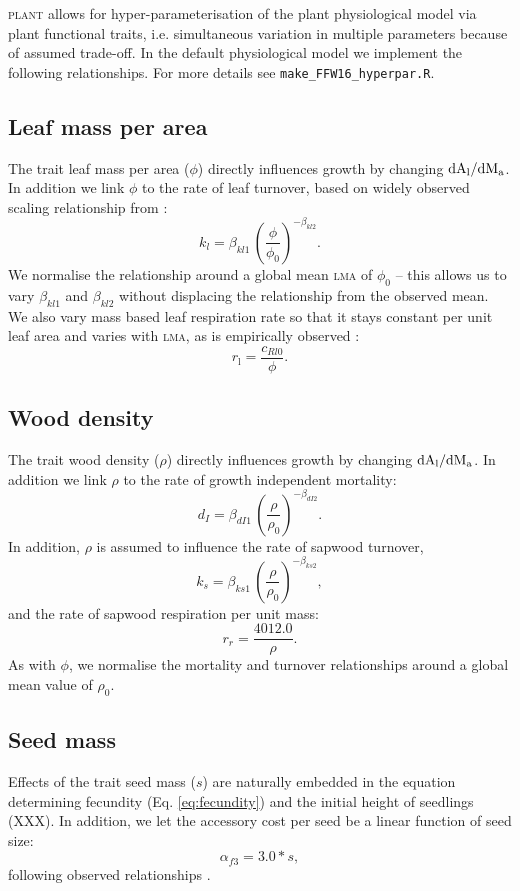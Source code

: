 \documentclass[10pt,twoside]{article}
\newcommand{\plant}{\textsc{plant}}
\begin{document}
{\plant} allows for
hyper-parameterisation of the plant physiological model via plant functional traits, i.e.
simultaneous variation in multiple parameters because of assumed trade-off. In the
default physiological model we implement the following relationships. For more
details see \texttt{make\_FFW16\_hyperpar.R}.

\subsection{Leaf mass per area}

The trait leaf mass per area ($\phi$) directly influences growth by changing
$\rm{d}A_\textrm{l} / \rm{d}M_\textrm{a}$. In addition we
link $\phi$ to the rate of leaf turnover,
based on widely observed scaling relationship from \citet{Wright-2004}:
$$k_l = \beta_{kl1} \, \left(\frac{\phi}{\phi_0}\right)^{-\beta_{kl2}}.$$
We normalise the relationship around a global mean \textsc{lma} of $\phi_0$ -- this
allows us to vary $\beta_{kl1}$ and $\beta_{kl2}$ without displacing the relationship from the
observed mean.
We also vary mass based leaf respiration rate so that it stays constant per unit leaf area and
varies with \textsc{lma}, as is empirically observed \citet{Wright-2004}:
$$r_\textrm{l} = \frac{c_{Rl0}}{\phi}.$$

\subsection{Wood density}

The trait wood density ($\rho$) directly influences growth by changing
$\rm{d}A_\textrm{l} / \rm{d}M_\textrm{a}$.  In addition we
link $\rho$ to the rate of growth independent mortality:
$$d_I = \beta_{dI1} \, \left(\frac{\rho}{\rho_0}\right) ^ {-\beta_{dI2}}.$$
In addition, $\rho$ is assumed to influence the rate of sapwood turnover,
$$k_s = \beta_{ks1} \, \left(\frac{\rho}{\rho_0}\right)^ {-\beta_{ks2}},$$
and the rate of sapwood respiration per unit mass:
$$r_r = \frac{4012.0}{\rho}.$$
As with $\phi$, we normalise the mortality and turnover
relationships around a global mean value of $\rho_0$.

\subsection{Seed mass}

Effects of the trait seed mass ($s$) are naturally embedded in the equation determining
fecundity (Eq. \ref{eq:fecundity}) and the initial height of seedlings (XXX). In addition,
we let the accessory cost per seed be a linear function of seed size:
$$\alpha_{f3} = 3.0 * s,$$
following observed relationships \citep{Henery-2001}.
\end{document}

